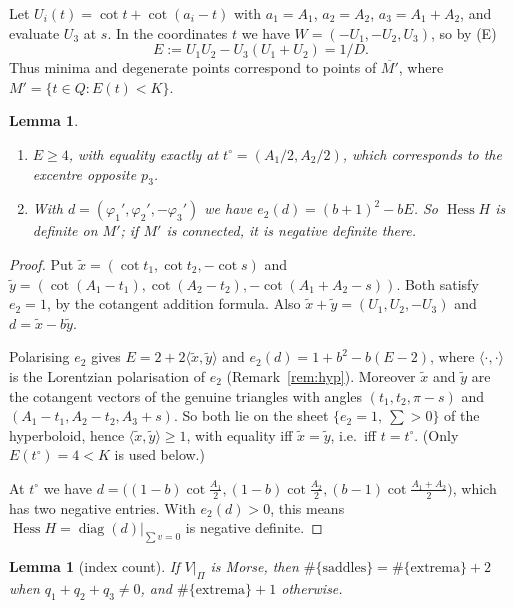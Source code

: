 \documentclass[11pt]{amsart}
\newtheorem{lemma}[theorem]{Lemma}
\theoremstyle{remark}
\DeclareMathOperator{\Hess}{Hess}
\begin{document}
Let $U_i(t)=\cot t+\cot(a_i-t)$ with $a_1=A_1$, $a_2=A_2$, $a_3=A_1+A_2$, and evaluate $U_3$ at $s$. In the
coordinates $t$ we have $W=(-U_1,-U_2,U_3)$, so by (E)
\begin{equation}\label{eq:E}
  E:=U_1U_2-U_3(U_1+U_2)=1/D .
\end{equation}
Thus minima and degenerate points correspond to points of $\overline{M'}$, where $M'=\{t\in Q:E(t)<K\}$.

\begin{lemma}\label{lem:sign}
\begin{enumerate}
\item $E\ge4$, with equality exactly at $t^\circ=(A_1/2,A_2/2)$, which corresponds to the excentre opposite $p_3$.
\item With $d=(\varphi_1',\varphi_2',-\varphi_3')$ we have $e_2(d)=(b+1)^2-bE$. So $\Hess H$ is definite on $M'$; if
  $M'$ is connected, it is negative definite there.
\end{enumerate}
\end{lemma}

\begin{proof}
Put $\tilde x=(\cot t_1,\cot t_2,-\cot s)$ and $\tilde y=(\cot(A_1-t_1),\cot(A_2-t_2),-\cot(A_1+A_2-s))$. Both satisfy
$e_2=1$, by the cotangent addition formula. Also $\tilde x+\tilde y=(U_1,U_2,-U_3)$ and $d=\tilde x-b\tilde y$.

Polarising $e_2$ gives $E=2+2\langle\tilde x,\tilde y\rangle$ and $e_2(d)=1+b^2-b(E-2)$, where $\langle\cdot,\cdot\rangle$
is the Lorentzian polarisation of $e_2$ (Remark~\ref{rem:hyp}). Moreover $\tilde x$ and $\tilde y$ are the cotangent
vectors of the genuine triangles with angles $(t_1,t_2,\pi-s)$ and $(A_1-t_1,A_2-t_2,A_3+s)$. So both lie on the sheet
$\{e_2=1,\ \sum>0\}$ of the hyperboloid, hence $\langle\tilde x,\tilde y\rangle\ge1$, with equality iff
$\tilde x=\tilde y$, i.e.\ iff $t=t^\circ$. (Only $E(t^\circ)=4<K$ is used below.)

At $t^\circ$ we have $d=\bigl((1-b)\cot\tfrac{A_1}2,(1-b)\cot\tfrac{A_2}2,(b-1)\cot\tfrac{A_1+A_2}2\bigr)$, which has
two negative entries. With $e_2(d)>0$, this means $\Hess H=\operatorname{diag}(d)|_{\sum v=0}$ is negative definite.
\end{proof}

\begin{lemma}[index count]\label{lem:index2}
If $V|_\Pi$ is Morse, then $\#\{\text{saddles}\}=\#\{\text{extrema}\}+2$ when $q_1+q_2+q_3\ne0$, and
$\#\{\text{extrema}\}+1$ otherwise.
\end{lemma}
\end{document}
